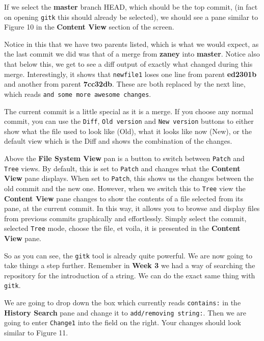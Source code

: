 If we select the \textbf{master} branch HEAD, which should be the top commit, (in fact on opening \texttt{gitk} this should already be selected), we should see a pane similar to Figure 10 in the \textbf{Content View} section of the screen.


Notice in this that we have two parents listed, which is what we would expect, as the last commit we did was that of a merge from \textbf{zaney} into \textbf{master}.
Notice also that below this, we get to see a diff output of exactly what changed during this merge.
Interestingly, it shows that \texttt{newfile1} loses one line from parent \textbf{ed2301b} and another from parent \textbf{7cc32db}.
These are both replaced by the next line, which reads \texttt{and some more awesome changes}.

The current commit is a little special as it is a merge.
If you choose any normal commit, you can use the \texttt{Diff}, \texttt{Old version} and \texttt{New version} buttons to either show what the file used to look like (Old), what it looks like now (New), or the default view which is the Diff and shows the combination of the changes.

Above the \textbf{File System View} pan is a button to switch between \texttt{Patch} and \texttt{Tree} views.
By default, this is set to \texttt{Patch} and changes what the \textbf{Content View} pane displays.
When set to \texttt{Patch}, this shows us the changes between the old commit and the new one.
However, when we switch this to \texttt{Tree} view the \textbf{Content View} pane changes to show the contents of a file selected from its pane, at the current commit.
In this way, it allows you to browse and display files from previous commits graphically and effortlessly.
Simply select the commit, selected \texttt{Tree} mode, choose the file, et voila, it is presented in the \textbf{Content View} pane.

So as you can see, the \texttt{gitk} tool is already quite powerful.
We are now going to take things a step further.
Remember in \textbf{Week 3} we had a way of searching the repository for the introduction of a string.
We can do the exact same thing with \texttt{gitk}.

We are going to drop down the box which currently reads \texttt{contains:} in the \textbf{History Search} pane and change it to \texttt{add/removing string:}.
Then we are going to enter \texttt{Change1} into the field on the right.
Your changes should look similar to Figure 11.

